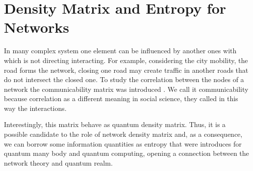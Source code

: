 \chapter{Density Matrix and Entropy for Networks}\label{C_Density_Matrix}

In many complex system one element can be influenced by another ones with which is not directing interacting. For example, considering the city mobility, the road forms the network, closing one road may create traffic in another roads that do not intersect the closed one. To study the correlation between the nodes of a network the communicability matrix was introduced \cite{Estrada_2008}.
We call it communicability because correlation as a different meaning in social science, they called in this way the interactions.

Interestingly, this matrix behave as quantum density matrix. Thus, it is a possible candidate to the role of network density matrix and, as a consequence, we can borrow some information quantities as entropy that were introduces for quantum many body and quantum computing, opening a connection between the network theory and quantum realm.



